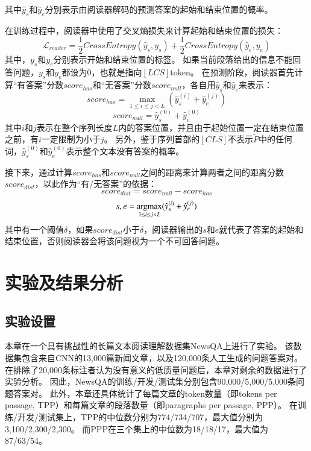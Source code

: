 其中$\hat y_s$和$\hat y_e$分别表示由阅读器解码的预测答案的起始和结束位置的概率。

在训练过程中，阅读器中使用了交叉熵损失来计算起始和结束位置的损失：
\begin{equation}
    \mathcal L_{reader} = \frac{1}{2} CrossEntropy(\hat y_s,y_s) + \frac{1}{2} CrossEntropy(\hat y_e,y_e)
\end{equation}
其中，$y_s$和$y_e$分别表示开始和结束位置的标签。
如果当前段落给出的信息不能回答问题，$y_s$和$y_e$都设为0，也就是指向$[LCS]$token。
在预测阶段，阅读器首先计算“有答案”分数$score_{has}$和“无答案”分数$score_{null}$，各自用$\hat y_s$和$\hat y_e$来表示：
\begin{equation}
    score_{has}=\max \limits_{1\le i\le j<L}(\hat y_{s}^{(i)}+\hat y_{e}^{(j)})
\end{equation}
\begin{equation}
    score_{null}=\hat y_{s}^{(0)}+\hat y_{e}^{(0)}
\end{equation}
其中$i$和$j$表示在整个序列长度$L$内的答案位置，并且由于起始位置一定在结束位置之前，有$i$一定限制为小于$j$。
另外，鉴于序列首部的$[CLS]$不表示$\tilde P$中的任何词，$\hat y^{(0)}_s$和$\hat y^{(0)}_e$表示整个文本没有答案的概率。

接下来，通过计算$score_{has}$和$score_{null}$之间的距离来计算两者之间的距离分数$score_{dist}$，以此作为“有/无答案”的依据：
\begin{equation}
    score_{dist}=score_{null}-score_{has}
\end{equation}
\begin{equation}
    s,e=\operatorname*{argmax} \limits_{1\le i\le j<L}(\hat y_{s}^{(i)}+\hat y_{e}^{(j)})
\end{equation}
其中有一个阈值$\delta$，如果$score_{dist}$小于$\delta$，阅读器输出的$s$和$e$就代表了答案的起始和结束位置，否则阅读器会将该问题视为一个不可回答问题。

\section{实验及结果分析}

\subsection{实验设置}
本章在一个具有挑战性的长篇文本阅读理解数据集NewsQA上进行了实验。
该数据集包含来自CNN的13,000篇新闻文章，以及120,000条人工生成的问题答案对。
在排除了20,000条标注者认为没有意义的低质量问题后，本章对剩余的数据进行了实验分析。
因此，NewsQA的训练/开发/测试集分别包含90,000/5,000/5,000条问题答案对。
此外，本章还具体统计了每篇文章的token数量（即tokens per passage, TPP）和每篇文章的段落数量（即paragraphs per passage, PPP）。
在训练/开发/测试集上，TPP的中位数分别为774/734/707，最大值分别为3,100/2,300/2,300。
而PPP在三个集上的中位数为18/18/17，最大值为87/63/54。

